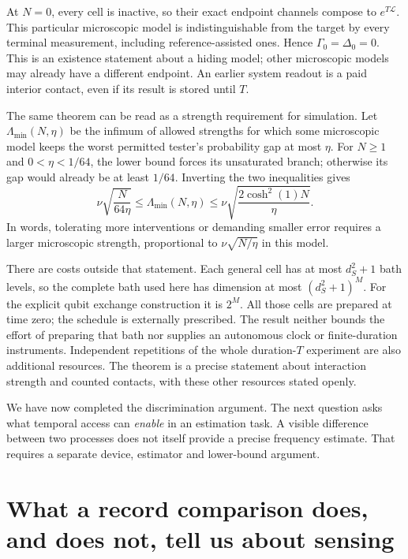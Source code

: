 \documentclass[11pt,a4paper]{article}
\numberwithin{equation}{section}
\theoremstyle{remark}
\begin{document}
At $N=0$, every cell is inactive, so their exact endpoint channels compose
to $e^{T\mathcal L}$. This particular microscopic model is indistinguishable
from the target by every terminal measurement, including reference-assisted
ones. Hence $\Gamma_0=\Delta_0=0$. This is an existence statement about
a hiding model; other microscopic models may already have a different
endpoint. An earlier system readout is a paid interior contact, even if
its result is stored until $T$.

The same theorem can be read as a strength requirement for simulation.
Let $\Lambda_{\min}(N,\eta)$ be the infimum of allowed strengths
for which some microscopic model keeps the worst permitted tester's
probability gap at most $\eta$. For $N\ge1$ and
$0<\eta<1/64$, the lower bound forces its unsaturated branch;
otherwise its gap would already be at least $1/64$. Inverting the two
inequalities gives
\begin{equation}
 \nu\sqrt{\frac{N}{64\eta}}
 \le\Lambda_{\min}(N,\eta)
 \le\nu\sqrt{\frac{2\cosh^2(1)N}{\eta}}.
 \label{sim:strength-cost}
\end{equation}
In words, tolerating more interventions or demanding smaller error
requires a larger microscopic strength, proportional to
$\nu\sqrt{N/\eta}$ in this model.

There are costs outside that statement. Each general cell has at most
$d_S^2+1$ bath levels, so the complete bath used here has dimension at most
$(d_S^2+1)^{M}$. For the explicit qubit exchange construction it
is $2^{M}$. All those cells are prepared at time zero; the
schedule is externally prescribed. The result neither bounds the effort
of preparing that bath nor supplies an autonomous clock or finite-duration
instruments. Independent repetitions of the whole duration-$T$ experiment
are also additional resources. The theorem is a precise statement about
interaction strength and counted contacts, with these other resources
stated openly.

We have now completed the discrimination argument. The next question asks
what temporal access can \emph{enable} in an estimation task. A visible
difference between two processes does not itself provide a precise
frequency estimate. That requires a separate device, estimator and
lower-bound argument.


\section{What a record comparison does, and does not, tell us about sensing}
\label{bridge:section}
\end{document}
